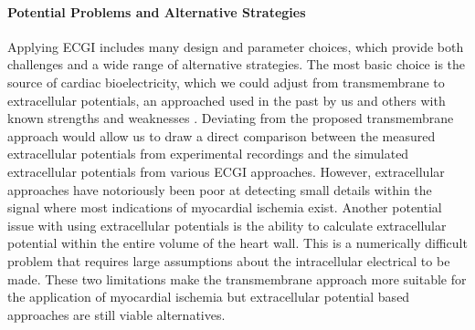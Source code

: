 \paragraph{Potential Problems and Alternative Strategies} Applying ECGI
includes many design and parameter choices, which provide both challenges
and a wide range of alternative strategies. The most basic choice is the
source of cardiac bioelectricity, which we could adjust from transmembrane
to extracellular potentials, an approached used in the past by us and
others with known strengths and weaknesses \cite{RSM:Mac95,RSM:Ost97b}. Deviating from the proposed transmembrane approach would allow us to draw a direct comparison between the measured extracellular potentials from experimental recordings and the simulated extracellular potentials from various ECGI approaches. However, extracellular approaches have notoriously been poor at detecting small details within the signal where most indications of myocardial ischemia exist. Another potential issue with using extracellular potentials is the ability to calculate extracellular potential within the entire volume of the heart wall. This is a numerically difficult problem that requires large assumptions about the intracellular electrical to be made. These two limitations make the transmembrane approach more suitable for the application of myocardial ischemia but extracellular potential based approaches are still viable alternatives.  

